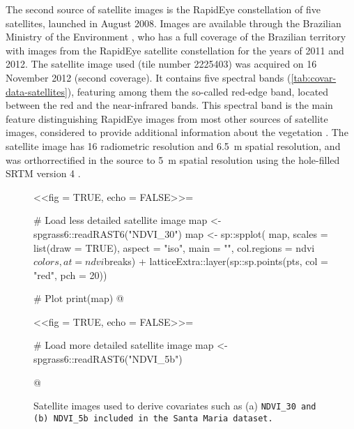 The second source of satellite images is the RapidEye constellation of five satellites, launched in August 
\num{2008}. Images are available through the Brazilian Ministry of the Environment \cite{Brasil2012}, who 
has a full coverage of the Brazilian territory with images from the RapidEye satellite constellation for the 
years of \num{2011} and \num{2012}. The satellite image used (tile number \num{2225403}) was acquired on 
\num{16} November \num{2012} (second coverage). It contains five spectral bands 
(\autoref{tab:covar-data-satellites}), featuring among them the so-called red-edge band, located between the 
red and the near-infrared bands. This spectral band is the main feature distinguishing RapidEye images from 
most other sources of satellite images, considered to provide additional information about the vegetation 
\cite{WeicheltEtAl2013}. The satellite image has \SI{16}{\bit} radiometric resolution and \SI{6.5}{\m} spatial 
resolution, and was orthorrectified in the source to \SI{5}{\m} spatial resolution using the hole-filled SRTM 
version \num{4} \cite{RapidEye2013}.

\begin{figure}[!ht]
 \centering
 \begin{minipage}[b]{63mm}
  \subcaption{}
  \centering
  <<fig = TRUE, echo = FALSE>>=
   
   # Load less detailed satellite image
   map <- spgrass6::readRAST6("NDVI_30")
   map <- sp::spplot(
    map, scales = list(draw = TRUE), aspect = "iso", main = "", col.regions = ndvi$colors, at = ndvi$breaks) + 
      latticeExtra::layer(sp::sp.points(pts, col = "red", pch = 20))
  
   # Plot
   print(map)
  @
 \end{minipage}
 
 \begin{minipage}[b]{63mm}
  \subcaption{}
  \centering
  <<fig = TRUE, echo = FALSE>>=
   
   # Load more detailed satellite image
   map <- spgrass6::readRAST6("NDVI_5b")
   
  @
 \end{minipage} 
 \caption{Satellite images used to derive covariates such as (a) \tt{NDVI_30} and (b) \tt{NDVI_5b} included in 
 the Santa Maria dataset.}
\label{fig:covar-data-sat-image}
\end{figure}

